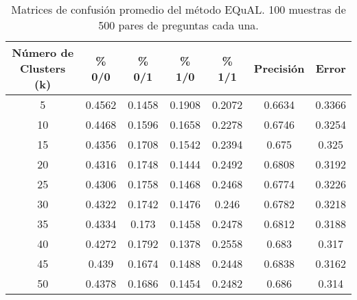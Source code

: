 \begin{table}[]
	\centering
	\begin{tabular}{|c|c|c|c|c|c|c|}
		\hline
		\rowcolor[HTML]{CFE2F3}
		\textbf{Número de Clusters (k)} & \textbf{\% 0/0} & \textbf{\% 0/1} & \textbf{\% 1/0} & \textbf{\% 1/1} & \textbf{Precisión} & \textbf{Error} \\ \hline
		5  & 0.4562 & 0.1458 & 0.1908 & 0.2072 & 0.6634 & 0.3366 \\ \hline
		10 & 0.4468 & 0.1596 & 0.1658 & 0.2278 & 0.6746 & 0.3254 \\ \hline
		15 & 0.4356 & 0.1708 & 0.1542 & 0.2394 & 0.675  & 0.325  \\ \hline
		20 & 0.4316 & 0.1748 & 0.1444 & 0.2492 & 0.6808 & 0.3192 \\ \hline
		25 & 0.4306 & 0.1758 & 0.1468 & 0.2468 & 0.6774 & 0.3226 \\ \hline
		30 & 0.4322 & 0.1742 & 0.1476 & 0.246  & 0.6782 & 0.3218 \\ \hline
		35 & 0.4334 & 0.173  & 0.1458 & 0.2478 & 0.6812 & 0.3188 \\ \hline
		40 & 0.4272 & 0.1792 & 0.1378 & 0.2558 & 0.683  & 0.317  \\ \hline
		45 & 0.439  & 0.1674 & 0.1488 & 0.2448 & 0.6838 & 0.3162 \\ \hline
		\rowcolor[HTML]{D9EAD3}
		50 & 0.4378 & 0.1686 & 0.1454 & 0.2482 & 0.686  & 0.314  \\ \hline
	\end{tabular}
	\caption{Matrices de confusión promedio del método EQuAL. 100 muestras de 500 pares de preguntas cada una. }
	\label{tab:analisis-100-500}
\end{table}

